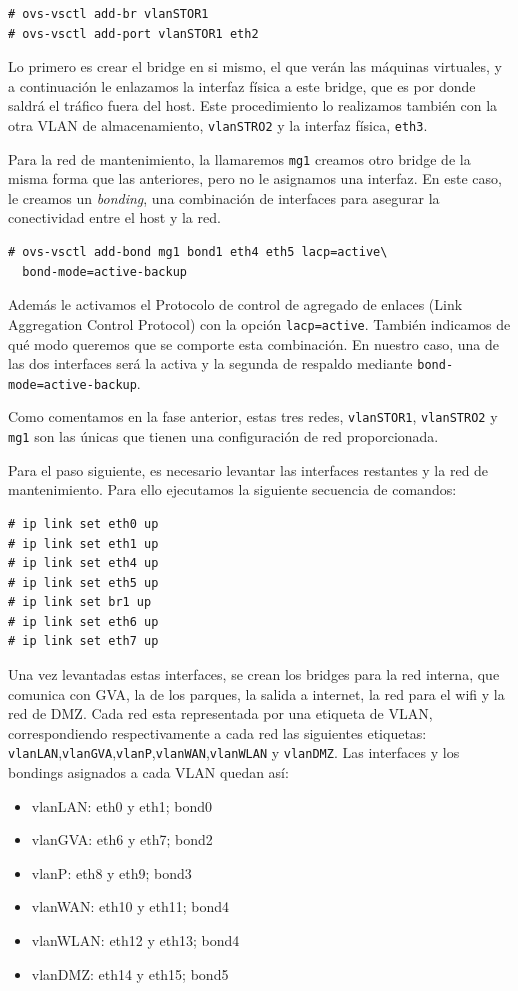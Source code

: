 \documentclass[12pt,a4paper,titlepage,twoside]{report}
\begin{document}
\begin{verbatim}
# ovs-vsctl add-br vlanSTOR1
# ovs-vsctl add-port vlanSTOR1 eth2 
\end{verbatim}
Lo primero es crear el bridge en si mismo, el que verán las máquinas virtuales, y a continuación le enlazamos la interfaz física a este bridge, que es por donde saldrá el tráfico fuera del host. Este procedimiento lo realizamos también con la otra VLAN de almacenamiento, \verb|vlanSTRO2| y la interfaz física, \verb|eth3|.
\par
Para la red de mantenimiento, la llamaremos \verb|mg1| creamos otro bridge de la misma forma que las anteriores, pero no le asignamos una interfaz. En este caso, le creamos un \textit{bonding}, una combinación de interfaces para asegurar la conectividad entre el host y la red.
\begin{verbatim}
# ovs-vsctl add-bond mg1 bond1 eth4 eth5 lacp=active\
  bond-mode=active-backup    
\end{verbatim}
Además le activamos el Protocolo de control de agregado de enlaces (Link Aggregation Control Protocol)\cite{lacp} con la opción \verb|lacp=active|. También indicamos de qué modo queremos que se comporte esta combinación. En nuestro caso, una de las dos interfaces será la activa y la segunda de respaldo mediante \verb|bond-mode=active-backup|.
\par
Como comentamos en la fase anterior, estas tres redes, \verb|vlanSTOR1|, \verb|vlanSTRO2| y \verb|mg1| son las únicas que tienen una configuración de red proporcionada. 
\par
Para el paso siguiente, es necesario levantar las interfaces restantes y la red de mantenimiento. Para ello ejecutamos la siguiente secuencia de comandos:
\begin{verbatim}
# ip link set eth0 up 
# ip link set eth1 up 
# ip link set eth4 up 
# ip link set eth5 up 
# ip link set br1 up 
# ip link set eth6 up 
# ip link set eth7 up 
\end{verbatim}
Una vez levantadas estas interfaces, se crean los bridges para la red interna, que comunica con GVA, la de los parques, la salida a internet, la red para el wifi y  la red de DMZ. Cada red esta representada por una etiqueta de VLAN, correspondiendo respectivamente a cada red las siguientes etiquetas: \verb|vlanLAN|,\verb|vlanGVA|,\verb|vlanP|,\verb|vlanWAN|,\verb|vlanWLAN| y \verb|vlanDMZ|. Las interfaces y los bondings asignados a cada VLAN quedan así:
\begin{itemize}
    \item vlanLAN: eth0 y eth1; bond0
    \item vlanGVA: eth6 y eth7; bond2
    \item vlanP: eth8 y eth9; bond3
    \item vlanWAN: eth10 y eth11; bond4
    \item vlanWLAN: eth12 y eth13; bond4
    \item vlanDMZ: eth14 y eth15; bond5
\end{itemize}
\end{document}
